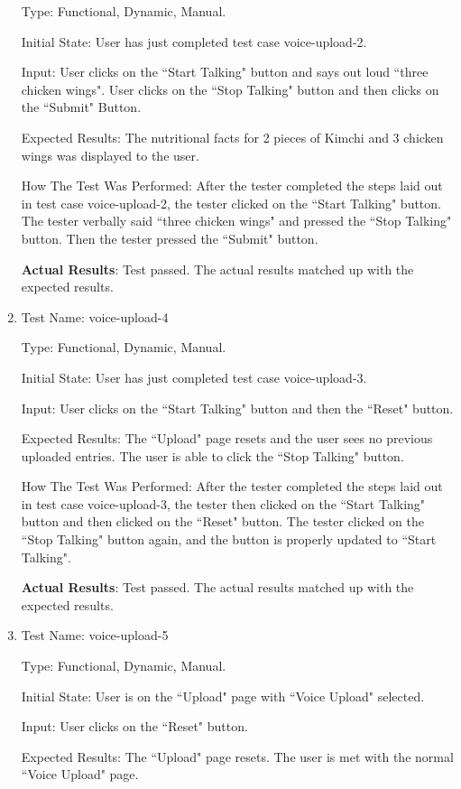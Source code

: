 \documentclass[12pt, titlepage]{article}
\begin{document}
\begin{enumerate}
		Type: Functional, Dynamic, Manual.
		
		Initial State: User has just completed test case voice-upload-2.
		
		Input: User clicks on the ``Start Talking" button and says out loud ``three chicken wings". User clicks on the ``Stop Talking" button and then clicks on the ``Submit" Button.
		
		Expected Results: The nutritional facts for 2 pieces of Kimchi and 3 chicken wings was displayed to the user.
		
		How The Test Was Performed: After the tester completed the steps laid out in test case voice-upload-2, the tester clicked on the ``Start Talking" button. The tester verbally said ``three chicken wings" and pressed the ``Stop Talking" button. Then the tester pressed the ``Submit" button.
		
		\textbf{Actual Results}: Test passed. The actual results matched up with the expected results.
		
		\item{Test Name: voice-upload-4}
		
		Type: Functional, Dynamic, Manual.
		
		Initial State: User has just completed test case voice-upload-3.
		
		Input: User clicks on the ``Start Talking" button and then the ``Reset" button.
		
		Expected Results: The ``Upload" page resets and the user sees no previous uploaded entries. The user is able to click the ``Stop Talking" button.
		
		How The Test Was Performed: After the tester completed the steps laid out in test case voice-upload-3, the tester then clicked on the ``Start Talking" button and then clicked on the ``Reset" button. The tester clicked on the ``Stop Talking" button again, and the button is properly updated to ``Start Talking".
		
		\textbf{Actual Results}: Test passed. The actual results matched up with the expected results.
		
		\item{Test Name: voice-upload-5}
		
		Type: Functional, Dynamic, Manual.
		
		Initial State: User is on the ``Upload" page with ``Voice Upload" selected.
		
		Input: User clicks on the ``Reset" button.
		
		Expected Results: The ``Upload" page resets. The user is met with the normal ``Voice Upload" page.
		

\end{enumerate}
\end{document}
